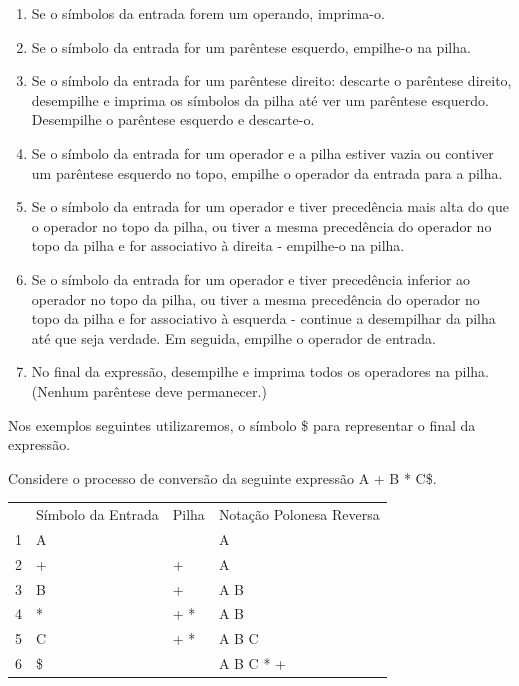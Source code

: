 \begin{enumerate}
\item Se o símbolos da entrada forem um operando, imprima-o.

\item Se o símbolo da entrada for um parêntese esquerdo, empilhe-o na pilha.

\item Se o símbolo da entrada for um parêntese direito: descarte o parêntese direito, desempilhe e imprima os símbolos da pilha até ver um parêntese esquerdo. Desempilhe o parêntese esquerdo e descarte-o.

\item Se o símbolo da entrada for um operador e a pilha estiver vazia ou contiver um parêntese esquerdo no topo, empilhe o operador da entrada para a pilha.

\item Se o símbolo da entrada for um operador e tiver precedência mais alta do que o operador no topo da pilha, ou tiver a mesma precedência do operador no topo da pilha e for associativo à direita - empilhe-o na pilha.

\item Se o símbolo da entrada for um operador e tiver precedência inferior ao operador no topo da pilha, ou tiver a mesma precedência do operador no topo da pilha e for associativo à esquerda - continue a desempilhar da pilha até que seja verdade. Em seguida, empilhe o operador de entrada.

\item No final da expressão, desempilhe e imprima todos os operadores na pilha. (Nenhum parêntese deve permanecer.)

\end{enumerate}

Nos exemplos seguintes utilizaremos, o símbolo \$ para representar o final da expressão.

\begin{exemplo}
Considere o processo de conversão da seguinte expressão A + B * C\$.

\begin{tabular}{llll}
  &Símbolo da Entrada    & Pilha  & Notação Polonesa Reversa \\
1 & A     &    & A \\
2 & +     & +  & A \\
3 & B     & +  & A B\\
4 & *     & + *  & A B\\
5 & C     & + *  & A B C\\
6 & \$     &    & A B C * +\\

\end{tabular}


\end{exemplo}


